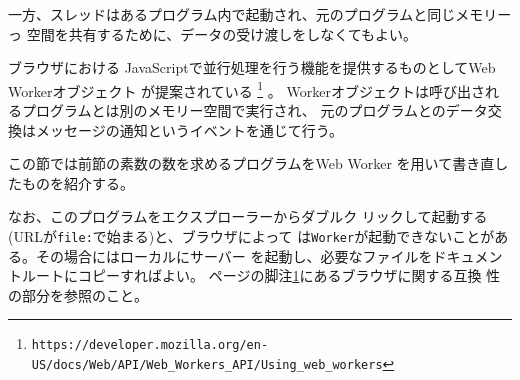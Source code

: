 一方、スレッドはあるプログラム内で起動され、元のプログラムと同じメモリーっ
空間を共有するために、データの受け渡しをしなくてもよい。

ブラウザにおける
JavaScriptで並行処理を行う機能を提供するものとしてWeb Workerオブジェクト
が提案されている
\footnote{\texttt{https://developer.mozilla.org/en-US/docs/Web/API/Web\_Workers\_API/Using\_web\_workers}\label{webworkers}}
。
Workerオブジェクトは呼び出されるプログラムとは別のメモリー空間で実行され、
元のプログラムとのデータ交換はメッセージの通知というイベントを通じて行う。

この節では前節の素数の数を求めるプログラムをWeb Worker を用いて書き直し
 たものを紹介する。

 なお、このプログラムをエクスプローラーからダブルク
 リックして起動する(URLが\texttt{file:}で始まる)と、ブラウザによって
 は\texttt{Worker}が起動できないことがある。その場合にはローカルにサーバー
 を起動し、必要なファイルをドキュメントルートにコピーすればよい。
 \pageref{webworkers}ページの脚注\ref{webworkers}にあるブラウザに関する互換
 性の部分を参照のこと。

